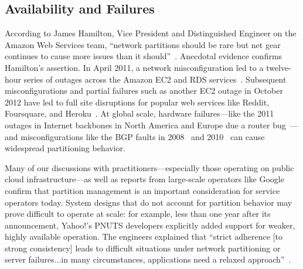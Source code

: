 \subsection{Availability and Failures}

According to James Hamilton, Vice President and Distinguished Engineer
on the Amazon Web Services team, ``network partitions should be rare
but net gear continues to cause more issues than it
should''~\cite{hamilton-partitions}. Anecdotal evidence confirms
Hamilton's assertion. In April 2011, a network misconfiguration led to
a twelve-hour series of outages across the Amazon EC2 and RDS
services~\cite{amazon-netpartition}. Subsequent misconfigurations and
partial failures such as another EC2 outage in October 2012 have led
to full site disruptions for popular web services like Reddit,
Foursquare, and Heroku~\cite{ec2-downsites}. At global scale, hardware
failures---like the 2011 outages in Internet backbones in North
America and Europe due a router bug~\cite{juniper-partition}---and
misconfigurations like the BGP faults in 2008~\cite{pakistan-youtube}
and 2010~\cite{research-experiment-partition} can cause widespread
partitioning behavior.

Many of our discussions with practitioners---especially those
operating on public cloud infrastructure---as well as reports from
large-scale operators like Google~\cite{dean-keynote} confirm that
partition management is an important consideration for service
operators today. System designs that do not account for partition
behavior may prove difficult to operate at scale: for example, less
than one year after its announcement, Yahoo!'s PNUTS developers
explicitly added support for weaker, highly available operation. The
engineers explained that ``strict adherence [to strong consistency]
leads to difficult situations under network partitioning or server
failures...in many circumstances, applications need a relaxed
approach''~\cite{pnuts-update}.

